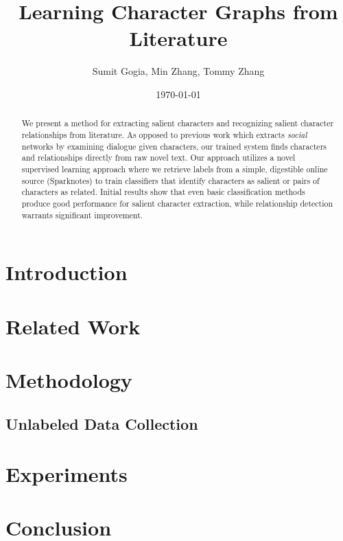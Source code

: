 \documentclass[12pt]{article}
\begin{document}
\title{Learning Character Graphs from Literature}
\author{Sumit Gogia, Min Zhang, Tommy Zhang}
\date{\today}

\maketitle

\begin{abstract}
We present a method for extracting salient characters and recognizing salient character relationships from literature. As opposed to previous work which extracts \emph{social} networks by examining dialogue given characters, our trained system finds characters and relationships directly from raw novel text. Our approach utilizes a novel supervised learning approach where we retrieve labels from a simple, digestible online source (Sparknotes) to train classifiers that identify characters as salient or pairs of characters as related. Initial results show that even basic classification methods produce good performance for salient character extraction, while relationship detection warrants significant improvement. 
\end{abstract}

\section{Introduction}
\section{Related Work}
\section{Methodology}
    \subsection{Unlabeled Data Collection}
    
\section{Experiments}
\section{Conclusion}
\end{document}
